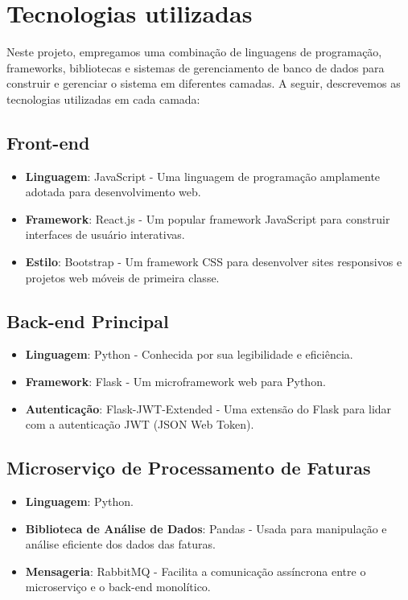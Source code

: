\section{Tecnologias utilizadas}

Neste projeto, empregamos uma combinação de linguagens de programação, frameworks, bibliotecas e sistemas de gerenciamento de banco de dados para construir e gerenciar o sistema em diferentes camadas. A seguir, descrevemos as tecnologias utilizadas em cada camada:

\subsection{Front-end}
\begin{itemize}
    \item \textbf{Linguagem}: JavaScript - Uma linguagem de programação amplamente adotada para desenvolvimento web.
    \item \textbf{Framework}: React.js - Um popular framework JavaScript para construir interfaces de usuário interativas.
    \item \textbf{Estilo}: Bootstrap - Um framework CSS para desenvolver sites responsivos e projetos web móveis de primeira classe.
\end{itemize}

\subsection{Back-end Principal}
\begin{itemize}
    \item \textbf{Linguagem}: Python - Conhecida por sua legibilidade e eficiência.
    \item \textbf{Framework}: Flask - Um microframework web para Python.
    \item \textbf{Autenticação}: Flask-JWT-Extended - Uma extensão do Flask para lidar com a autenticação JWT (JSON Web Token).
\end{itemize}

\subsection{Microserviço de Processamento de Faturas}
\begin{itemize}
    \item \textbf{Linguagem}: Python.
    \item \textbf{Biblioteca de Análise de Dados}: Pandas - Usada para manipulação e análise eficiente dos dados das faturas.
    \item \textbf{Mensageria}: RabbitMQ - Facilita a comunicação assíncrona entre o microserviço e o back-end monolítico.
\end{itemize}


